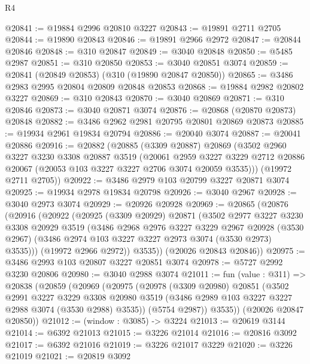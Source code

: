 \begin{lexlean}{R4}
\begin{coremodule}
@20841 := @19884 @2996 @20810 @3227
@20843 := @19891 @2711 @2705
@20844 := @19890 @20843
@20846 := @19891 @2966 @2972
@20847 := @20844 @20846
@20848 := @310 @20847
@20849 := @3040 @20848
@20850 := @5485 @2987
@20851 := @310 @20850
@20853 := @3040 @20851 @3074
@20859 := @20841 (@20849 @20853) (@310 (@19890 @20847 @20850))
@20865 := @3486 @2983 @2995 @20804 @20809 @20848 @20853
@20868 := @19884 @2982 @20802 @3227
@20869 := @310 @20843
@20870 := @3040 @20869
@20871 := @310 @20846
@20873 := @3040 @20871 @3074
@20876 := @20868 (@20870 @20873) @20848
@20882 := @3486 @2962 @2981 @20795 @20801 @20869 @20873
@20885 := @19934 @2961 @19834 @20794
@20886 := @20040 @3074
@20887 := @20041 @20886
@20916 := @20882
    (@20885
      (@3309 @20887)
      @20869
      (@3502
        @2960
        @3227
        @3230
        @3308
        @20887
        @3519
        (@20061
          @2959
          @3227
          @3229
          @2712
          @20886
          @20067
          (@20053 @103 @3227 @3227 @2706 @3074 @20059 @3535)))
      (@19972 @2711 @2705))
@20922 := @3486 @2979 @103 @20799 @3227 @20871 @3074
@20925 := @19934 @2978 @19834 @20798
@20926 := @3040 @2967
@20928 := @3040 @2973 @3074
@20929 := @20926 @20928
@20969 := @20865
    (@20876
      (@20916
        (@20922
          (@20925
            (@3309 @20929)
            @20871
            (@3502
              @2977
              @3227
              @3230
              @3308
              @20929
              @3519
              (@3486
                @2968
                @2976
                @3227
                @3229
                @2967
                @20928
                (@3530 @2967)
                (@3486 @2974 @103 @3227 @3227 @2973 @3074 (@3530 @2973) @3535)))
            (@19972 @2966 @2972))
          @3535))
      (@20026 @20843 @20846))
@20975 := @3486 @2993 @103 @20807 @3227 @20851 @3074
@20978 := @5727 @2992 @3230 @20806
@20980 := @3040 @2988 @3074
@21011 := fun (value : @311) =>
  @20838
    (@20859
      (@20969
        (@20975
          (@20978
            (@3309 @20980)
            @20851
            (@3502
              @2991
              @3227
              @3229
              @3308
              @20980
              @3519
              (@3486 @2989 @103 @3227 @3227 @2988 @3074 (@3530 @2988) @3535))
            (@5754 @2987))
          @3535))
      (@20026 @20847 @20850))
@21012 := (window : @3085) -> @3224
@21013 := @20619 @3144
@21014 := @6392 @21013
@21015 := @3226 @21014
@21016 := @20816 @3092
@21017 := @6392 @21016
@21019 := @3226 @21017 @3229
@21020 := @3226 @21019
@21021 := @20819 @3092

\end{coremodule}
\end{lexlean}
